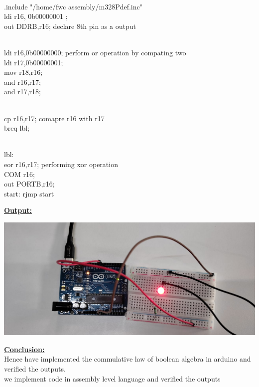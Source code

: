 \documentclass[letterpaper, 10 pt, conference]{ieeeconf}
\begin{document}
\vspace{2cm}
\\.include "/home/fwc assembly/m328Pdef.inc"
\\ldi r16, 0b00000001 ;  
\\out DDRB,r16; declare 8th pin as a output 



\\ldi r16,0b00000000; perform or operation by compating two 
\\ldi r17,0b00000001;
\\mov r18,r16;
\\and r16,r17;
\\and r17,r18;

\\cp r16,r17;  comapre r16 with r17
\\breq lbl; 

\\lbl:
\\eor r16,r17; performing xor operation
\\COM r16;
\\out PORTB,r16;
\\start: rjmp start
\\
\vspace{1cm}
\raggedright \textbf{\underline{Output:}}\vspace{7mm} 
\raggedright \begin{center} \includegraphics[scale=0.09]{out.jpg} \end{center}


\raggedright \textbf{\underline{Conclusion:}}\vspace{7mm}
\\ Hence have implemented the commulative law of boolean algebra in arduino and verified the outputs.
\\ we implement code in assembly level language and verified the outputs
\end{document}
